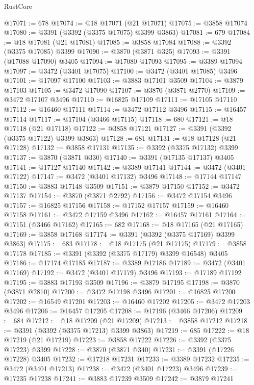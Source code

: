 \begin{lexlean}{RustCore}
\begin{coremodule}
@17071 := 678
@17074 := @18 @17071 (@21 @17071)
@17075 := @3858 @17074
@17080 := @3391 (@3392 (@3375 @17075) @3399 @3863)
@17081 := 679
@17084 := @18 @17081 (@21 @17081)
@17085 := @3858 @17084
@17088 := @3392 (@3375 @17085) @3399
@17090 := @3870 (@3871 @325)
@17093 := @3391 (@17088 @17090) @3405
@17094 := @17080 @17093
@17095 := @3389 @17094
@17097 := @3472 (@3401 @17075)
@17100 := @3472 (@3401 @17085) @3496
@17101 := @17097 @17100
@17103 := @3883 @17101 @3509
@17104 := @3879 @17103
@17105 := @3472 @17090
@17107 := @3870 (@3871 @2770)
@17109 := @3472 @17107 @3496
@17110 := @16825 @17109
@17111 := @17105 @17110
@17112 := @16460 @17111
@17114 := @3472 @17112 @3496
@17115 := @16457 @17114
@17117 := @17104 (@3466 @17115)
@17118 := 680
@17121 := @18 @17118 (@21 @17118)
@17122 := @3858 @17121
@17127 := @3391 (@3392 (@3375 @17122) @3399 @3863)
@17128 := 681
@17131 := @18 @17128 (@21 @17128)
@17132 := @3858 @17131
@17135 := @3392 (@3375 @17132) @3399
@17137 := @3870 (@3871 @330)
@17140 := @3391 (@17135 @17137) @3405
@17141 := @17127 @17140
@17142 := @3389 @17141
@17144 := @3472 (@3401 @17122)
@17147 := @3472 (@3401 @17132) @3496
@17148 := @17144 @17147
@17150 := @3883 @17148 @3509
@17151 := @3879 @17150
@17152 := @3472 @17137
@17154 := @3870 (@3871 @2792)
@17156 := @3472 @17154 @3496
@17157 := @16825 @17156
@17158 := @17152 @17157
@17159 := @16460 @17158
@17161 := @3472 @17159 @3496
@17162 := @16457 @17161
@17164 := @17151 (@3466 @17162)
@17165 := 682
@17168 := @18 @17165 (@21 @17165)
@17169 := @3858 @17168
@17174 := @3391 (@3392 (@3375 @17169) @3399 @3863)
@17175 := 683
@17178 := @18 @17175 (@21 @17175)
@17179 := @3858 @17178
@17185 := @3391 (@3392 (@3375 @17179) @3399 @16548) @3405
@17186 := @17174 @17185
@17187 := @3389 @17186
@17189 := @3472 (@3401 @17169)
@17192 := @3472 (@3401 @17179) @3496
@17193 := @17189 @17192
@17195 := @3883 @17193 @3509
@17196 := @3879 @17195
@17198 := @3870 (@3871 @2810)
@17200 := @3472 @17198 @3496
@17201 := @16825 @17200
@17202 := @16549 @17201
@17203 := @16460 @17202
@17205 := @3472 @17203 @3496
@17206 := @16457 @17205
@17208 := @17196 (@3466 @17206)
@17209 := 684
@17212 := @18 @17209 (@21 @17209)
@17213 := @3858 @17212
@17218 := @3391 (@3392 (@3375 @17213) @3399 @3863)
@17219 := 685
@17222 := @18 @17219 (@21 @17219)
@17223 := @3858 @17222
@17226 := @3392 (@3375 @17223) @3399
@17228 := @3870 (@3871 @340)
@17231 := @3391 (@17226 @17228) @3405
@17232 := @17218 @17231
@17233 := @3389 @17232
@17235 := @3472 (@3401 @17213)
@17238 := @3472 (@3401 @17223) @3496
@17239 := @17235 @17238
@17241 := @3883 @17239 @3509
@17242 := @3879 @17241

\end{coremodule}
\end{lexlean}
